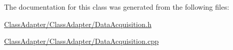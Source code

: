 The documentation for this class was generated from the following files\+:\begin{DoxyCompactItemize}
\item 
\mbox{\hyperlink{_class_adapter_2_class_adapter_2_data_acquisition_8h}{Class\+Adapter/\+Class\+Adapter/\+Data\+Acquisition.\+h}}\item 
\mbox{\hyperlink{_class_adapter_2_class_adapter_2_data_acquisition_8cpp}{Class\+Adapter/\+Class\+Adapter/\+Data\+Acquisition.\+cpp}}\end{DoxyCompactItemize}
